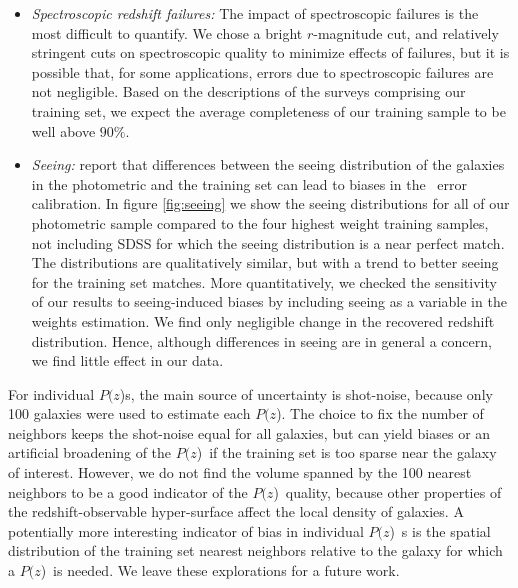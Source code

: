\documentclass[preprint]{aastex}
\newcommand{\pofz}{$P(z$)}
\begin{document}
\begin{itemize}
\item {\it Spectroscopic redshift failures: } The impact of spectroscopic failures is the
most difficult to quantify.  We chose a bright $r$-magnitude cut, and relatively
stringent cuts on spectroscopic quality to minimize effects of failures, but it
is possible that, for some applications, errors due to spectroscopic failures are not negligible.
Based on the descriptions of the surveys comprising our training set, we expect the average
completeness of our training sample to be well above $90\%$.


\item {\it Seeing: } \citet{Nakajima11} report that differences
between the seeing distribution of the galaxies in the photometric and the
training set can lead to biases in the \photoz\ error calibration.  In figure
\ref{fig:seeing} we show the seeing distributions for all of our photometric
sample compared to the four highest weight training samples, not including SDSS
for which the seeing distribution is a near perfect match.  The distributions
are qualitatively similar, but with a trend to better seeing for the training
set matches.  More quantitatively, we checked the sensitivity of our results to
seeing-induced biases by including seeing as a variable in the weights
estimation.  We find only negligible change in the recovered redshift
distribution.  Hence, although differences in seeing are in general a concern, we
find little effect in our data.
\end{itemize}

For individual \pofz s, the main source of uncertainty is shot-noise, because
only 100 galaxies were used to estimate each \pofz.  The choice to fix the
number of neighbors keeps the shot-noise equal for all galaxies, but can 
yield biases or an artificial broadening of the \pofz\ if the training set is
too sparse near the galaxy of interest.  However, we do not find the volume
spanned by the 100 nearest neighbors to be a good indicator of the \pofz\
quality, because other properties of the redshift-observable
hyper-surface affect the local density of galaxies.  A potentially more
interesting indicator of bias in individual \pofz\ s is the spatial distribution
of the training set nearest neighbors relative to the galaxy for which a \pofz\
is needed.  We leave these explorations for a future work.
\end{document}
